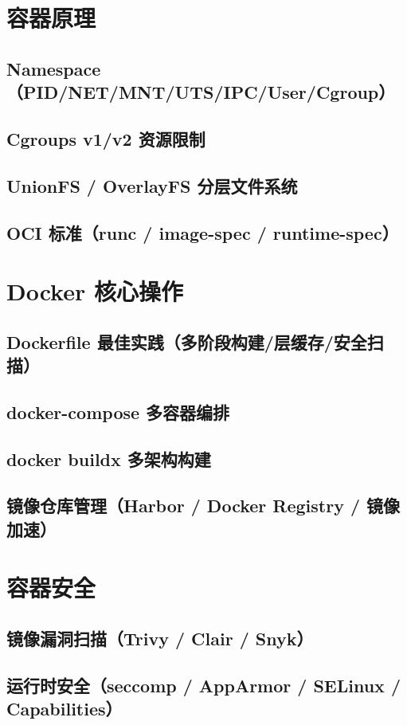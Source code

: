 \documentclass[12pt,UTF8]{ctexbook}
\begin{document}
  \section{容器原理}
    \subsection{Namespace（PID/NET/MNT/UTS/IPC/User/Cgroup）}
    \subsection{Cgroups v1/v2 资源限制}
    \subsection{UnionFS / OverlayFS 分层文件系统}
    \subsection{OCI 标准（runc / image-spec / runtime-spec）}

  \section{Docker 核心操作}
    \subsection{Dockerfile 最佳实践（多阶段构建/层缓存/安全扫描）}
    \subsection{docker-compose 多容器编排}
    \subsection{docker buildx 多架构构建}
    \subsection{镜像仓库管理（Harbor / Docker Registry / 镜像加速）}

  \section{容器安全}
    \subsection{镜像漏洞扫描（Trivy / Clair / Snyk）}
    \subsection{运行时安全（seccomp / AppArmor / SELinux / Capabilities）}
\end{document}
